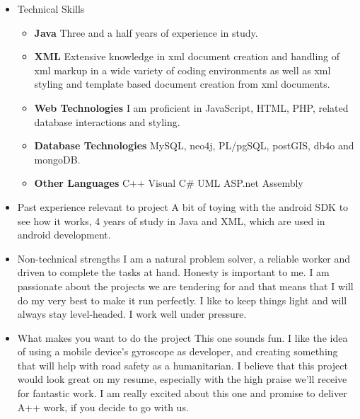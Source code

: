 \documentclass[12pt, oneside]{article}
\begin{document}
\begin{enumerate}
\begin{itemize}
							\item Technical Skills\newline
								\begin{itemize}
								\item {\bf Java}\newline
									Three and a half years of experience in study.
								\item {\bf XML}\newline
									Extensive knowledge in xml document creation and handling of xml markup in a wide variety of coding environments as well as xml styling and template based document creation from xml documents.
								\item {\bf Web Technologies}\newline
									I am proficient in JavaScript, HTML, PHP, related database interactions and styling.
								\item {\bf Database Technologies}\newline
								MySQL, neo4j, PL/pgSQL, postGIS, db4o and mongoDB.
								\item {\bf Other Languages}\newline
									C++\newline
									Visual C\#\newline
									UML\newline	
									ASP.net\newline
									Assembly\newline
								\end{itemize}
							\item Past experience relevant to project\newline
								A bit of toying with the android SDK to see how it works, 4 years of study in Java and XML, which are used in android development.
							\item Non-technical strengths\newline
								I am a natural problem solver, a reliable worker and driven to complete the tasks at hand. Honesty is important to me. I am passionate about the projects we are tendering for and that means that I will do my very best to make it run perfectly. I like to keep things light and will always stay level-headed. I work well under pressure.
							\item What makes you want to do the project\newline
								This one sounds fun. I like the idea of using a mobile device's gyroscope as developer, and creating something that will help with road safety as a humanitarian. I believe that this project would look great on my resume, especially with the high praise we'll receive for fantastic work. I am really excited about this one and promise to deliver A++ work, if you decide to go with us.

\end{itemize}
\end{enumerate}
\end{document}

